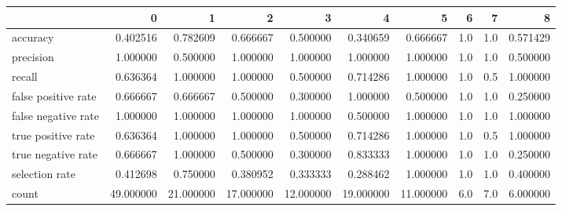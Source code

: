 \begin{tabular}{lrrrrrrrrr}
\toprule
{} &          0 &          1 &          2 &          3 &          4 &          5 &    6 &    7 &         8 \\
\midrule
accuracy            &   0.402516 &   0.782609 &   0.666667 &   0.500000 &   0.340659 &   0.666667 &  1.0 &  1.0 &  0.571429 \\
precision           &   1.000000 &   0.500000 &   1.000000 &   1.000000 &   1.000000 &   1.000000 &  1.0 &  1.0 &  0.500000 \\
recall              &   0.636364 &   1.000000 &   1.000000 &   0.500000 &   0.714286 &   1.000000 &  1.0 &  0.5 &  1.000000 \\
false positive rate &   0.666667 &   0.666667 &   0.500000 &   0.300000 &   1.000000 &   0.500000 &  1.0 &  1.0 &  0.250000 \\
false negative rate &   1.000000 &   1.000000 &   1.000000 &   1.000000 &   0.500000 &   1.000000 &  1.0 &  1.0 &  1.000000 \\
true positive rate  &   0.636364 &   1.000000 &   1.000000 &   0.500000 &   0.714286 &   1.000000 &  1.0 &  0.5 &  1.000000 \\
true negative rate  &   0.666667 &   1.000000 &   0.500000 &   0.300000 &   0.833333 &   1.000000 &  1.0 &  1.0 &  0.250000 \\
selection rate      &   0.412698 &   0.750000 &   0.380952 &   0.333333 &   0.288462 &   1.000000 &  1.0 &  1.0 &  0.400000 \\
count               &  49.000000 &  21.000000 &  17.000000 &  12.000000 &  19.000000 &  11.000000 &  6.0 &  7.0 &  6.000000 \\
\bottomrule
\end{tabular}
